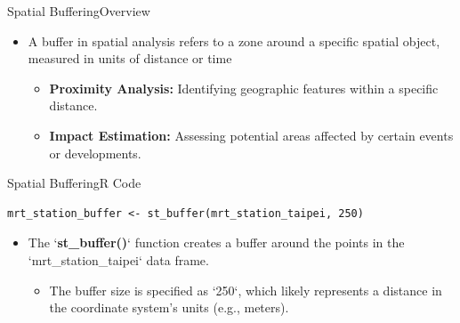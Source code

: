 \documentclass[hyperref={pdfpagelabels=false}]{beamer}
\begin{document}
\begin{frame}{Spatial Buffering}{Overview}

	
	\begin{itemize}
		\item A buffer in spatial analysis refers to a zone around a specific spatial object, measured in units of distance or time
					\vspace{0.2cm}
			\begin{itemize}
			\item \textbf{Proximity Analysis:} Identifying geographic features within a specific distance.
			\vspace{0.2cm}
			\item \textbf{Impact Estimation:} Assessing potential areas affected by certain events or developments.
			
		\end{itemize}
		
	\end{itemize}
\end{frame}





\begin{frame}[fragile]{Spatial Buffering}{R Code}
\begin{lstlisting}
mrt_station_buffer <- st_buffer(mrt_station_taipei, 250)
\end{lstlisting}
\begin{itemize}
\item The `\textbf{st\_buffer()}` function creates a buffer around the points in the  `mrt\_station\_taipei` data frame.
	\vspace{0.2cm}
	\begin{itemize}
		\item The buffer size is specified as `250`, which likely represents a distance in the coordinate system's units (e.g., meters).
	\end{itemize}
\end{itemize}
\end{frame}
\end{document}
